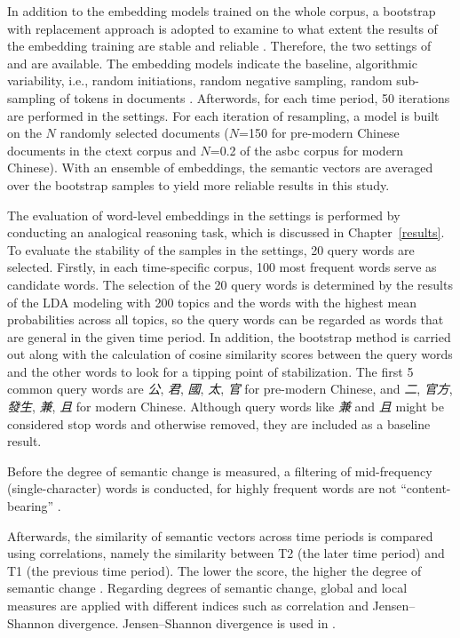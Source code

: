 In addition to the embedding models trained on the whole corpus, a bootstrap with replacement approach is adopted to examine to what extent the results of the embedding training are stable and reliable \parencite{antoniak2018evaluating}. Therefore, the two settings of  and  are available. The  embedding models indicate the baseline, algorithmic variability, i.e., random initiations, random negative sampling, random sub-sampling of tokens in documents \parencite{antoniak2018evaluating}. Afterwords, for each time period, 50 iterations are performed in the  settings. For each iteration of resampling, a model is built on the $N$ randomly selected documents ($N$=150 for pre-modern Chinese documents in the \gls{ctext} corpus and $N$=0.2 of the \gls{asbc} corpus for modern Chinese). With an ensemble of embeddings, the semantic vectors are averaged over the bootstrap samples to yield more reliable results in this study.

The evaluation of word-level embeddings in the  settings is performed by conducting an analogical reasoning task, which is discussed in Chapter~\ref{results}. To evaluate the stability of the samples in the  settings, 20 query words are selected. Firstly, in each time-specific corpus, 100 most frequent words serve as candidate words. The selection of the 20 query words is determined by the results of the LDA modeling with 200 topics and the words with the highest mean probabilities across all topics, so the query words can be regarded as words that are general in the given time period. In addition, the bootstrap method is carried out along with the calculation of cosine similarity scores between the query words and the other words to look for a tipping point of stabilization. The first 5 common query words are \textit{公}, \textit{君}, \textit{國}, \textit{太}, \textit{官} for pre-modern Chinese, and \textit{二}, \textit{官方}, \textit{發生}, \textit{兼}, \textit{且} for modern Chinese. Although query words like \textit{兼} and \textit{且} might be considered stop words and otherwise removed, they are included as a baseline result.

Before the degree of semantic change is measured, a filtering of mid-frequency (single-character) words is conducted, for highly frequent words are not ``content-bearing'' \parencite{hamilton2016cultural,rodda2017panta}.

Afterwards, the similarity of semantic vectors across time periods is compared using correlations, namely the similarity between T2 (the later time period) and T1 (the previous time period). The lower the score, the higher the degree of semantic change \parencite{hamilton2016law}. Regarding degrees of semantic change, global and local measures are applied with different indices such as correlation and Jensen–Shannon divergence. Jensen–Shannon divergence is used in \textcite{giulianelli2019lexical}.

